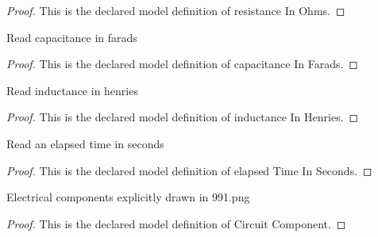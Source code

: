 \begin{proof}
  This is the declared model definition of resistance In Ohms.
\end{proof}
\begin{definition}
  \label{def:physics:phyx-mini-0991:phyxminiproblems-problemphyxmini0991-capacitanceinfarads}
  Read capacitance in farads
\end{definition}
\begin{proof}
  This is the declared model definition of capacitance In Farads.
\end{proof}
\begin{definition}
  \label{def:physics:phyx-mini-0991:phyxminiproblems-problemphyxmini0991-inductanceinhenries}
  Read inductance in henries
\end{definition}
\begin{proof}
  This is the declared model definition of inductance In Henries.
\end{proof}
\begin{definition}
  \label{def:physics:phyx-mini-0991:phyxminiproblems-problemphyxmini0991-elapsedtimeinseconds}
  Read an elapsed time in seconds
\end{definition}
\begin{proof}
  This is the declared model definition of elapsed Time In Seconds.
\end{proof}
\begin{definition}
  \label{def:physics:phyx-mini-0991:phyxminiproblems-problemphyxmini0991-circuitcomponent}
  Electrical components explicitly drawn in 991.png
\end{definition}
\begin{proof}
  This is the declared model definition of Circuit Component.
\end{proof}
